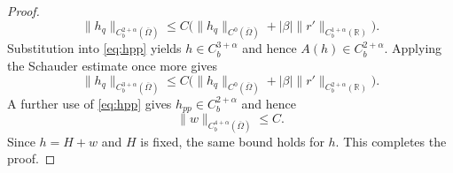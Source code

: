 \documentclass[12pt,letterpaper]{amsart}
\numberwithin{equation}{section}
\def\R{{\mathbb R}}
\begin{document}
\begin{proof}
{\begin{equation*}
	\|h_q\|_{C_b^{2+\alpha}(\overline\Omega)}\leq C\bigl(\|h_q\|_{C^0(\overline\Omega)}+|\beta|\|r'\|_{C_b^{1+\alpha}(\R)}\bigr).
\end{equation*}
Substitution into \eqref{eq:hpp} yields $h\in C_b^{3+\alpha}$ and hence $A(h)\in C_b^{2+\alpha}$. Applying the Schauder estimate once more gives
\begin{equation*}
	\|h_q\|_{C_b^{3+\alpha}(\overline\Omega)}\leq C\bigl(\|h_q\|_{C^0(\overline\Omega)}+|\beta|\|r'\|_{C_b^{2+\alpha}(\R)}\bigr).
\end{equation*}
{A further use of \eqref{eq:hpp} gives $h_{pp}\in C_b^{2+\alpha}$ and hence}
\[\|w\|_{C_b^{4+\alpha}(\overline\Omega)}\leq C.\]}
{Since $h=H+w$ and $H$ is fixed, the same bound holds for $h$. This completes the proof.}
\end{proof}	
	
\end{document}
